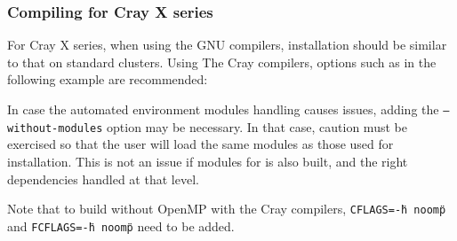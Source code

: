 \documentclass[a4paper,10pt,twoside]{csshortdoc}
\begin{document}
\subsubsection{Compiling for Cray X series}

For Cray X series, when using the GNU compilers, installation should
be similar to that on standard clusters. Using The Cray compilers,
options such as in the following example are recommended:


In case the automated environment modules handling causes issues,
adding the \texttt{--without-modules} option may be necessary.
In that case, caution must be exercised so that the user will load
the same modules as those used for installation. This is not an issue
if modules for \CS is also built, and the right dependencies
handled at that level.

Note that to build without OpenMP with the Cray compilers,
\texttt{CFLAGS=\"-h noomp\"} and \texttt{FCFLAGS=\"-h noomp\"}
need to be added.
\end{document}
